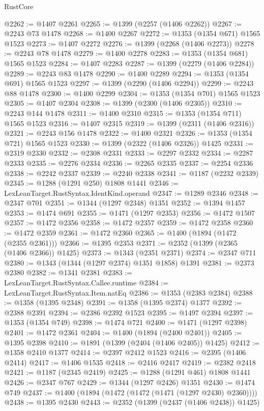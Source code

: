 \begin{lexlean}{RustCore}
\begin{coremodule}
@2262 := @1407 @2261
@2265 := @1399 (@2257 (@1406 @2262))
@2267 := @2243 @73 @1478
@2268 := @1400 @2267
@2272 := @1353 (@1354 @671) @1565 @1523
@2273 := @1407 @2272
@2276 := @1399 (@2268 (@1406 @2273))
@2278 := @2243 @78 @1478
@2279 := @1400 @2278
@2283 := @1353 (@1354 @681) @1565 @1523
@2284 := @1407 @2283
@2287 := @1399 (@2279 (@1406 @2284))
@2289 := @2243 @83 @1478
@2290 := @1400 @2289
@2294 := @1353 (@1354 @691) @1565 @1523
@2297 := @1399 (@2290 (@1406 @2294))
@2299 := @2243 @88 @1478
@2300 := @1400 @2299
@2304 := @1353 (@1354 @701) @1565 @1523
@2305 := @1407 @2304
@2308 := @1399 (@2300 (@1406 @2305))
@2310 := @2243 @144 @1478
@2311 := @1400 @2310
@2315 := @1353 (@1354 @711) @1565 @1523
@2316 := @1407 @2315
@2319 := @1399 (@2311 (@1406 @2316))
@2321 := @2243 @156 @1478
@2322 := @1400 @2321
@2326 := @1353 (@1354 @721) @1565 @1523
@2330 := @1399 (@2322 (@1406 @2326)) @1425
@2331 := @2319 @2330
@2332 := @2308 @2331
@2333 := @2297 @2332
@2334 := @2287 @2333
@2335 := @2276 @2334
@2336 := @2265 @2335
@2337 := @2254 @2336
@2338 := @2242 @2337
@2339 := @2240 @2338
@2341 := @1187 (@2232 @2339)
@2345 := @1288 (@1291 @250) @1808 @1441
@2346 := LexLeanTarget.RustSyntax.IdentKind.operand
@2347 := @1289 @2346
@2348 := @2347 @701
@2351 := @1344 (@1297 @2348) @1351
@2352 := @1394 @1457
@2353 := @1474 @691
@2355 := @1471 (@1297 @2353)
@2356 := @1472 @1507
@2357 := @1472 @2356
@2358 := @1472 @2357
@2359 := @1472 @2358
@2360 := @1472 @2359
@2361 := @1472 @2360
@2365 := @1400 (@1894 (@1472 (@2355 @2361)))
@2366 := @1395 @2353
@2371 := @2352 (@1399 (@2365 (@1406 @2366)) @1425)
@2373 := @1343 (@2351 @2371)
@2374 := @2347 @711
@2380 := @1343 (@1344 (@1297 @2374) @1351 @1858) @1391
@2381 := @2373 @2380
@2382 := @1341 @2381
@2383 := LexLeanTarget.RustSyntax.Callee.runtime
@2384 := LexLeanTarget.RustSyntax.Item.natEq
@2386 := @1353 (@2383 @2384)
@2388 := @1358 (@1395 @2348)
@2391 := @1358 (@1395 @2374) @1377
@2392 := @2388 @2391
@2394 := @2386 @2392 @1523
@2395 := @1497 @2394
@2397 := @1353 (@1354 @749)
@2398 := @1474 @721
@2400 := @1471 (@1297 @2398)
@2401 := @1472 @2361
@2404 := @1400 (@1894 (@2400 @2401))
@2405 := @1395 @2398
@2410 := @1891 (@1399 (@2404 (@1406 @2405)) @1425)
@2412 := @1358 @2410 @1377
@2414 := @2397 @2412 @1523
@2416 := @2395 (@1406 @2414)
@2417 := @1406 @1535
@2418 := @2416 @2417
@2419 := @2382 @2418
@2421 := @1187 (@2345 @2419)
@2425 := @1288 (@1291 @461) @1808 @1441
@2426 := @2347 @767
@2429 := @1344 (@1297 @2426) @1351
@2430 := @1474 @749
@2437 := @1400 (@1894 (@1472 (@1472 (@1471 (@1297 @2430) @2360))))
@2438 := @1395 @2430
@2443 := @2352 (@1399 (@2437 (@1406 @2438)) @1425)

\end{coremodule}
\end{lexlean}
